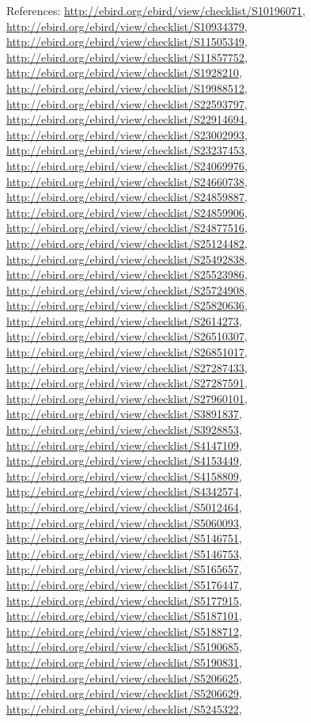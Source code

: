 \documentclass[9pt, article]{memoir}
\begin{document}
\begin{multicols}{2}
\vspace{6pt}References: 
\url{http://ebird.org/ebird/view/checklist/S10196071}, 
\url{http://ebird.org/ebird/view/checklist/S10934379}, 
\url{http://ebird.org/ebird/view/checklist/S11505349}, 
\url{http://ebird.org/ebird/view/checklist/S11857752}, 
\url{http://ebird.org/ebird/view/checklist/S1928210}, 
\url{http://ebird.org/ebird/view/checklist/S19988512}, 
\url{http://ebird.org/ebird/view/checklist/S22593797}, 
\url{http://ebird.org/ebird/view/checklist/S22914694}, 
\url{http://ebird.org/ebird/view/checklist/S23002993}, 
\url{http://ebird.org/ebird/view/checklist/S23237453}, 
\url{http://ebird.org/ebird/view/checklist/S24069976}, 
\url{http://ebird.org/ebird/view/checklist/S24660738}, 
\url{http://ebird.org/ebird/view/checklist/S24859887}, 
\url{http://ebird.org/ebird/view/checklist/S24859906}, 
\url{http://ebird.org/ebird/view/checklist/S24877516}, 
\url{http://ebird.org/ebird/view/checklist/S25124482}, 
\url{http://ebird.org/ebird/view/checklist/S25492838}, 
\url{http://ebird.org/ebird/view/checklist/S25523986}, 
\url{http://ebird.org/ebird/view/checklist/S25724908}, 
\url{http://ebird.org/ebird/view/checklist/S25820636}, 
\url{http://ebird.org/ebird/view/checklist/S2614273}, 
\url{http://ebird.org/ebird/view/checklist/S26510307}, 
\url{http://ebird.org/ebird/view/checklist/S26851017}, 
\url{http://ebird.org/ebird/view/checklist/S27287433}, 
\url{http://ebird.org/ebird/view/checklist/S27287591}, 
\url{http://ebird.org/ebird/view/checklist/S27960101}, 
\url{http://ebird.org/ebird/view/checklist/S3891837}, 
\url{http://ebird.org/ebird/view/checklist/S3928853}, 
\url{http://ebird.org/ebird/view/checklist/S4147109}, 
\url{http://ebird.org/ebird/view/checklist/S4153449}, 
\url{http://ebird.org/ebird/view/checklist/S4158809}, 
\url{http://ebird.org/ebird/view/checklist/S4342574}, 
\url{http://ebird.org/ebird/view/checklist/S5012464}, 
\url{http://ebird.org/ebird/view/checklist/S5060093}, 
\url{http://ebird.org/ebird/view/checklist/S5146751}, 
\url{http://ebird.org/ebird/view/checklist/S5146753}, 
\url{http://ebird.org/ebird/view/checklist/S5165657}, 
\url{http://ebird.org/ebird/view/checklist/S5176447}, 
\url{http://ebird.org/ebird/view/checklist/S5177915}, 
\url{http://ebird.org/ebird/view/checklist/S5187101}, 
\url{http://ebird.org/ebird/view/checklist/S5188712}, 
\url{http://ebird.org/ebird/view/checklist/S5190685}, 
\url{http://ebird.org/ebird/view/checklist/S5190831}, 
\url{http://ebird.org/ebird/view/checklist/S5206625}, 
\url{http://ebird.org/ebird/view/checklist/S5206629}, 
\url{http://ebird.org/ebird/view/checklist/S5245322}, 

\end{multicols}
\end{document}
